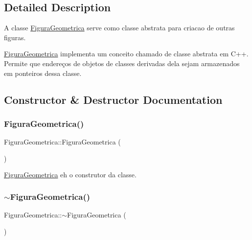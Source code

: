 \subsection{Detailed Description}
A classe \hyperlink{class_figura_geometrica}{Figura\+Geometrica} serve como classe abstrata para criacao de outras figuras. 

\hyperlink{class_figura_geometrica}{Figura\+Geometrica} implementa um conceito chamado de classe abstrata em C++. Permite que endereços de objetos de classes derivadas dela sejam armazenados em ponteiros dessa classe. 

\subsection{Constructor \& Destructor Documentation}
\mbox{\label{class_figura_geometrica_a81d7c7efaea511e60a15f5a363138dd9}} 
\subsubsection{\texorpdfstring{Figura\+Geometrica()}{FiguraGeometrica()}}
{\footnotesize\ttfamily Figura\+Geometrica\+::\+Figura\+Geometrica (\begin{DoxyParamCaption}{ }\end{DoxyParamCaption})}



\hyperlink{class_figura_geometrica}{Figura\+Geometrica} eh o construtor da classe. 

\mbox{\label{class_figura_geometrica_ad13b9bccf1b14f6b9fbc662aad61ffd1}} 
\subsubsection{\texorpdfstring{$\sim$\+Figura\+Geometrica()}{~FiguraGeometrica()}}
{\footnotesize\ttfamily Figura\+Geometrica\+::$\sim$\+Figura\+Geometrica (\begin{DoxyParamCaption}{ }\end{DoxyParamCaption})\hspace{0.3cm}{\ttfamily [virtual]}}



